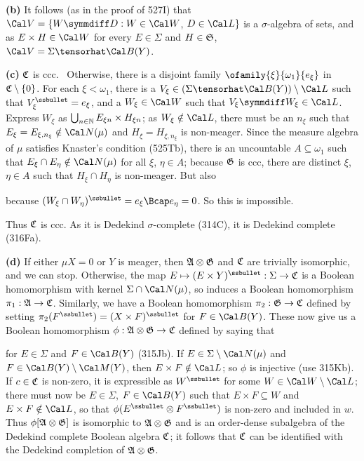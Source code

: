{{\bf (b)} It follows (as in the proof of 527I) that
$\Cal V=\{W\symmdiff D:W\in\Cal W$, $D\in\Cal L\}$ is a $\sigma$-algebra of sets, and as
$E\times H\in\Cal W$ for every $E\in\Sigma$ and $H\in\frak S$,
$\Cal V=\Sigma\tensorhat\Cal B(Y)$.

\medskip

{\bf (c)} $\frak C$ is ccc.   \Prf\Quer\ Otherwise, there is a disjoint family
$\ofamily{\xi}{\omega_1}{e_{\xi}}$
in $\frak C\setminus\{0\}$.   For each $\xi<\omega_1$, there is a
$V_{\xi}\in(\Sigma\tensorhat\Cal B(Y))\setminus\Cal L$ such that
$V_{\xi}^{\ssbullet}=e_{\xi}$, and a $W_{\xi}\in\Cal W$ such that
$V_{\xi}\symmdiff W_{\xi}\in\Cal L$.   Express $W_{\xi}$ as
$\bigcup_{n\in\Bbb N}E_{\xi n}\times H_{\xi n}$;  as $W_{\xi}\notin\Cal L$, there must
be an $n_{\xi}$ such that $E_{\xi}=E_{\xi,n_{\xi}}\notin\Cal N(\mu)$ and
$H_{\xi}=H_{\xi,n_{\xi}}$ is non-meager.    Since the measure algebra of
$\mu$ satisfies Knaster's condition (525Tb), there is an uncountable
$A\subseteq\omega_1$ such that $E_{\xi}\cap E_{\eta}\notin\Cal N(\mu)$
for all $\xi$, $\eta\in A$;  because
$\frak G$ is ccc, there are distinct $\xi$, $\eta\in A$ such that
$H_{\xi}\cap H_{\eta}$ is non-meager.   But also


\noindent because
$(W_{\xi}\cap W_{\eta})^{\ssbullet}=e_{\xi}\Bcap e_{\eta}=0$.
So this is impossible.\ \Bang\Qed

Thus $\frak C$ is ccc.   As it is Dedekind $\sigma$-complete (314C),
it is Dedekind complete (316Fa).

\medskip

{\bf (d)} If either $\mu X=0$ or $Y$ is meager, then
$\frak A\otimes\frak G$ and $\frak C$ are trivially isomorphic, and we can
stop.   Otherwise,
the map $E\mapsto(E\times Y)^{\ssbullet}:\Sigma\to\frak C$ is a Boolean
homomorphism with kernel $\Sigma\cap\Cal N(\mu)$, so induces a Boolean
homomorphism
$\pi_1:\frak A\to\frak C$.   Similarly, we have a Boolean homomorphism
$\pi_2:\frak G\to\frak C$ defined by setting
$\pi_2(F^{\ssbullet})=(X\times F)^{\ssbullet}$ for $F\in\Cal B(Y)$.
These now give
us a Boolean homomorphism $\phi:\frak A\otimes\frak G\to\frak C$ defined
by saying that


\noindent for $E\in\Sigma$ and $F\in\Cal B(Y)$ (315Jb).   If
$E\in\Sigma\setminus\Cal N(\mu)$ and $F\in\Cal B(Y)\setminus\Cal M(Y)$,
then $E\times F\notin\Cal L$;  so $\phi$ is injective
(use 315Kb).   If $c\in\frak C$ is
non-zero, it is expressible as $W^{\ssbullet}$ for some
$W\in\Cal W\setminus\Cal L$;
there must now be $E\in\Sigma$, $F\in\Cal B(Y)$ such that
$E\times F\subseteq W$ and $E\times F\notin\Cal L$, so that
$\phi(E^{\ssbullet}\otimes F^{\ssbullet})$ is
non-zero and included in $w$.
Thus $\phi[\frak A\otimes\frak G]$ is isomorphic to
$\frak A\otimes\frak G$ and is an order-dense
subalgebra of the Dedekind complete Boolean algebra $\frak C$;
it follows that
$\frak C$ can be identified with the Dedekind completion of
$\frak A\otimes\frak G$.
}%

